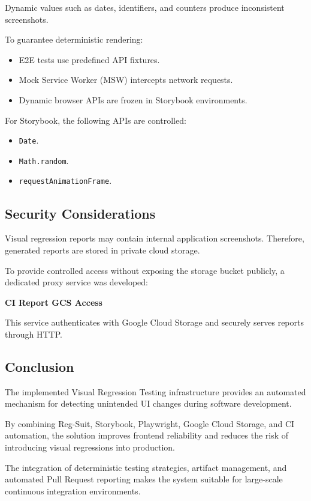 Dynamic values such as dates, identifiers, and counters produce inconsistent screenshots.

To guarantee deterministic rendering:

\begin{itemize}
    \item E2E tests use predefined API fixtures.
    \item Mock Service Worker (MSW) intercepts network requests.
    \item Dynamic browser APIs are frozen in Storybook environments.
\end{itemize}

For Storybook, the following APIs are controlled:

\begin{itemize}
    \item \texttt{Date}.
    \item \texttt{Math.random}.
    \item \texttt{requestAnimationFrame}.
\end{itemize}


\subsection{Security Considerations}

Visual regression reports may contain internal application screenshots. Therefore, generated reports are stored in private cloud storage.

To provide controlled access without exposing the storage bucket publicly, a dedicated proxy service was developed:

\textbf{CI Report GCS Access}

This service authenticates with Google Cloud Storage and securely serves reports through HTTP.


\subsection{Conclusion}

The implemented Visual Regression Testing infrastructure provides an automated mechanism for detecting unintended UI changes during software development.

By combining Reg-Suit, Storybook, Playwright, Google Cloud Storage, and CI automation, the solution improves frontend reliability and reduces the risk of introducing visual regressions into production.

The integration of deterministic testing strategies, artifact management, and automated Pull Request reporting makes the system suitable for large-scale continuous integration environments.

\clearpage
